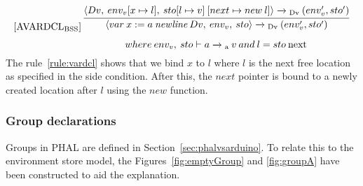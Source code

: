 \begin{equation}\label{rule:vardcl}
\begin{minipage}{.2\linewidth}
$[\text{AVARDCL}_\text{BSS}]$
\end{minipage}
\begin{minipage}{.8\linewidth}
\centering
$\cfrac{\langle Dv, \: env_v [x \mapsto l], \: sto[l \mapsto v] \: [next \mapsto new \: l]\rangle \xrightarrow{}\textsubscript{Dv} \: (env_v', sto') }{\langle var \: x:= a \: \textit{newline} \: Dv, \: env_v, \: sto \rangle \xrightarrow{}\textsubscript{Dv} \: (env_v', sto')}$
\[where \: env_v, \: sto \vdash a \xrightarrow{}\textsubscript{a} \: v \: and \: l = sto \: \text{next}\]
\end{minipage}
\end{equation}
The rule~\ref{rule:vardcl} shows that we bind $x$ to $l$ where $l$ is the next free location as specified in the side condition. After this, the $next$ pointer is bound to a newly created location after $l$ using the $new$ function.

\subsubsection{Group declarations}
Groups in PHAL are defined in Section~\ref{sec:phalvsarduino}. To relate this to the environment store model, the Figures~\ref{fig:emptyGroup} and \ref{fig:groupA} have been constructed to aid the explanation. 

